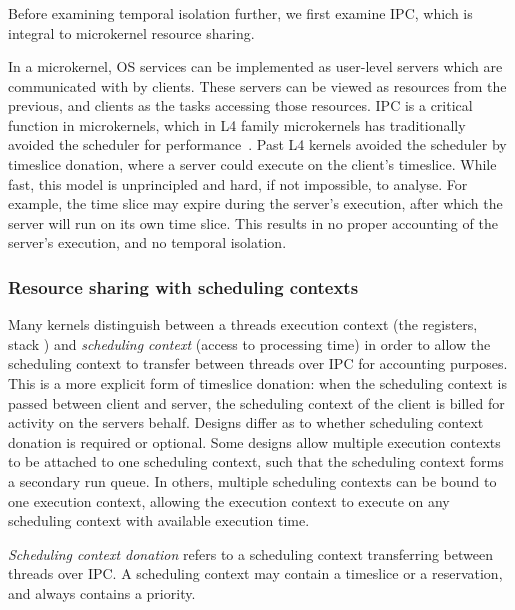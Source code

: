 \subsubsection{}

Before examining temporal isolation further, we first examine \gls{IPC}, which is integral to 
microkernel resource sharing. 

In a microkernel, \gls{OS} services can be implemented as user-level servers which are communicated
with by clients. These servers can be viewed as resources from the previous, and clients as the
tasks accessing those resources. \gls{IPC} is a critical function in microkernels, which in L4
family microkernels has traditionally avoided the scheduler for
performance~\citep{Heiser_Elphinstone_16}. Past L4 kernels avoided the scheduler by timeslice
donation, where a server could execute on the client's timeslice. While fast, this model is
unprincipled and hard, if not impossible, to analyse. For example, the time slice may expire during
the server's execution, after which the server will run on its own time slice.  This results in no
proper accounting of the server's execution, and no temporal isolation.

\subsubsection{Resource sharing with scheduling contexts}
\label{s:sc-intro}

Many kernels distinguish between a threads execution context (the registers, stack \etc) and
\emph{scheduling context} (access to processing time) in order to allow the scheduling context to
transfer between threads over \gls{IPC} for accounting purposes.  This is a more explicit form of
timeslice donation: when the scheduling context is passed between client and server, the scheduling
context of the client is billed for activity on the servers behalf.  Designs differ as to whether
scheduling context donation is required or optional.  Some designs allow multiple execution contexts
to be attached to one scheduling context, such that the scheduling context forms a secondary run
queue.  In others, multiple scheduling contexts can be bound to one execution context, allowing the
execution context to execute on any scheduling context with available execution time. 

\emph{Scheduling context donation} refers to a scheduling context transferring between threads over
\gls{IPC}. A scheduling context may contain a timeslice or a reservation, and always contains a
priority.

